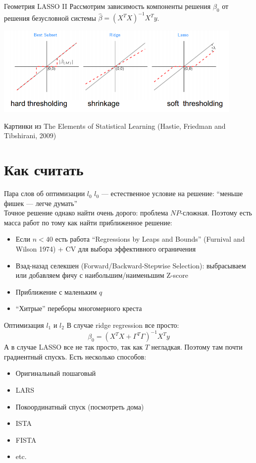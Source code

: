 \documentclass[14pt, fleqn, xcolor={dvipsnames, table}]{beamer}
\begin{document}
\begin{frame}{Геометрия LASSO II}
\small
Рассмотрим зависимость компоненты решения $\beta_0$ от решения безусловной системы $\hat{\beta} = \left(X^TX\right)^{-1}X^Ty$.
\begin{center}
\includegraphics[width=0.9\textwidth]{shrinkage.png} 
\end{center}
\footnotesize
Картинки из The Elements of Statistical Learning (Hastie, Friedman and Tibshirani, 2009)
\end{frame}

\section{Как считать}
\begin{frame}{Пара слов об оптимизации $l_0$}
\small
$l_0$ --- естественное условие на решение: ``меньше фишек --- легче думать'' \\
Точное решение однако найти очень дорого: проблема $NP$-сложная. Поэтому есть масса работ по тому как найти приближенное решение:
\begin{itemize}
  \item Если $n < 40$ есть работа ``Regressions by Leaps and Bounds'' (Furnival and Wilson 1974) + CV для выбора эффективного ограничения
  \item Взад-назад селекшен (Forward/Backward-Stepwise Selection): выбрасываем или добавляем фичу с наибольшим/наименьшим Z-score
  \item Приближение с маленьким $q$
  \item ``Хитрые'' переборы многомерного креста
\end{itemize}
\end{frame}

\begin{frame}{Оптимизация $l_1$ и $l_2$}
\small
В случае ridge regression все просто:
$$
\beta_0 = \left(X^{T}X+ \Gamma^{T} \Gamma\right)^{-1}X^{T}y
$$
А в случае LASSO все не так просто, так как $T$ негладкая. Поэтому там почти градиентный спускъ. Есть несколько способов:
\begin{itemize}
\small
  \item Оригинальный пошаговый
  \item LARS
  \item Покоординатный спуск (посмотреть дома)
  \item ISTA
  \item FISTA
  \item etc.
\end{itemize}
\end{frame}
\end{document}
